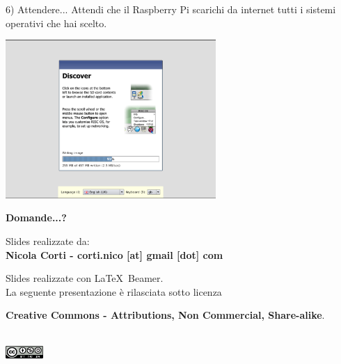 \documentclass[xcolor=svgnames,11pt]{beamer}
\begin{document}
\begin{frame}{6) Attendere...}
Attendi che il Raspberry Pi scarichi da internet tutti i sistemi operativi che hai scelto.

\medskip
\begin{center}
\includegraphics[width=8cm]{guide/6.png}
\end{center}
\end{frame}

\begin{frame}{}
\begin{center}
\begin{Huge}
{\color{green_raspi} \textbf{Domande...?}}
\end{Huge}

\vspace{1.5cm}
\begin{small}
Slides realizzate da:\\
\textbf{Nicola Corti - corti.nico [at] gmail [dot] com}\\

\bigskip

Slides realizzate con \LaTeX\ Beamer.\\
La seguente presentazione \`e rilasciata sotto licenza\\
\begin{footnotesize}	\textbf{Creative Commons - Attributions, Non Commercial, Share-alike}.
\end{footnotesize}
\\
\medskip
\includegraphics[height=0.5cm]{cc.png}

\end{small}
\end{center}
\end{frame}
\end{document}
